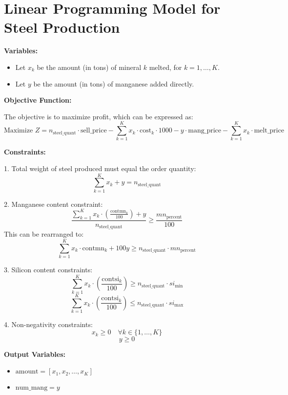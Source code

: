 \documentclass{article}
\begin{document}
\section*{Linear Programming Model for Steel Production}

\textbf{Variables:}
\begin{itemize}
    \item Let \( x_k \) be the amount (in tons) of mineral \( k \) melted, for \( k = 1, \ldots, K \).
    \item Let \( y \) be the amount (in tons) of manganese added directly.
\end{itemize}

\textbf{Objective Function:}

The objective is to maximize profit, which can be expressed as:
\[
\text{Maximize } Z = n_{\text{steel\_quant}} \cdot \text{sell\_price} - \sum_{k=1}^{K} x_k \cdot \text{cost}_k \cdot 1000 - y \cdot \text{mang\_price} - \sum_{k=1}^{K} x_k \cdot \text{melt\_price}
\]

\textbf{Constraints:}

1. Total weight of steel produced must equal the order quantity:
\[
\sum_{k=1}^{K} x_k + y = n_{\text{steel\_quant}}
\]

2. Manganese content constraint:
\[
\frac{\sum_{k=1}^{K} x_k \cdot \left( \frac{\text{contmn}_k}{100} \right) + y}{n_{\text{steel\_quant}}} \geq \frac{mn_{\text{percent}}}{100}
\]
This can be rearranged to:
\[
\sum_{k=1}^{K} x_k \cdot \text{contmn}_k + 100y \geq n_{\text{steel\_quant}} \cdot mn_{\text{percent}}
\]

3. Silicon content constraints:
\[
\sum_{k=1}^{K} x_k \cdot \left( \frac{\text{contsi}_k}{100} \right) \geq n_{\text{steel\_quant}} \cdot si_{\text{min}}
\]
\[
\sum_{k=1}^{K} x_k \cdot \left( \frac{\text{contsi}_k}{100} \right) \leq n_{\text{steel\_quant}} \cdot si_{\text{max}}
\]

4. Non-negativity constraints:
\[
x_k \geq 0 \quad \forall k \in \{1, \ldots, K\}
\]
\[
y \geq 0
\]

\textbf{Output Variables:}
\begin{itemize}
    \item \( \text{amount} = [x_1, x_2, \ldots, x_K] \)
    \item \( \text{num\_mang} = y \)
\end{itemize}
\end{document}
